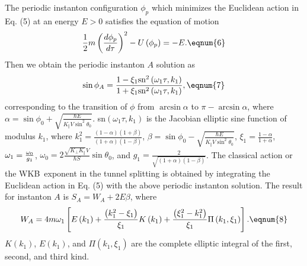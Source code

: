The periodic instanton configuration $\phi _p$ which minimizes the Euclidean
action in Eq. (5) at an energy $E>0$ satisfies the equation of motion 
\begin{equation}
\frac 12m\left( \frac{d\phi _p}{d\tau }\right) ^2-U\left( \phi _p\right) =-E.
\eqnum{6}
\end{equation}
Then we obtain the periodic instanton $A$ solution as 
\begin{equation}
\sin \phi _A=\frac{1-\xi _1\text{sn}^2\left( \omega _1\tau ,k_1\right) }{%
1+\xi _1\text{sn}^2\left( \omega _1\tau ,k_1\right) },  \eqnum{7}
\end{equation}
corresponding to the transition of $\phi $ from $\arcsin \alpha $ to $\pi
-\arcsin \alpha $, where $\alpha =\sin \phi _0+\sqrt{\frac{\hbar E}{K_{\Vert
}V\sin ^2\theta _0}}$. sn$\left( \omega _1\tau ,k_1\right) $ is the Jacobian
elliptic sine function of modulus $k_1$, where $k_1^2=\frac{\left( 1-\alpha
\right) \left( 1+\beta \right) }{\left( 1+\alpha \right) \left( 1-\beta
\right) }$, $\beta =\sin \phi _0-\sqrt{\frac{\hbar E}{K_{\Vert }V\sin
^2\theta _0}}$, $\xi _1=\frac{1-\alpha }{1+\alpha }$, $\omega _1=\frac{%
\omega _0}{g_1}$, $\omega _0=2\frac{\sqrt{K_{\bot }K_{\Vert }}V}{\hbar S}%
\sin \theta _0$, and $g_1=\frac 2{\sqrt{\left( 1+\alpha \right) \left(
1-\beta \right) }}$. The classical action or the WKB\ exponent in the tunnel
splitting is obtained by integrating the Euclidean action in Eq. (5) with
the above periodic instanton solution. The result for instanton $A$ is $%
S_A=W_A+2E\beta $, where 
\begin{equation}
W_A=4m\omega _1\left[ E\left( k_1\right) +\frac{\left( k_1^2-\xi _1\right) }{%
\xi _1}K\left( k_1\right) +\frac{\left( \xi _1^2-k_1^2\right) }{\xi _1}\Pi
\left( k_1,\xi _1\right) \right] .  \eqnum{8}
\end{equation}
$K\left( k_1\right) $, $E\left( k_1\right) $, and $\Pi \left( k_1,\xi
_1\right) $ are the complete elliptic integral of the first, second, and
third kind.

